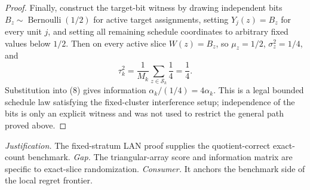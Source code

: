 \documentclass{article}
\begin{document}
\begin{proof}
Finally, construct the target-bit witness by drawing independent bits \(B_z\sim\operatorname{Bernoulli}(1/2)\) for active target assignments, setting \(Y_j(z)=B_z\) for every unit \(j\), and setting all remaining schedule coordinates to arbitrary fixed values below \(1/2\).  Then on every active slice \(W(z)=B_z\), so \(\mu_z=1/2\), \(\sigma_z^2=1/4\), and
\[
 \tau_k^2=\frac1{M_k}\sum_{z\in\mathcal S_k}\frac14=\frac14.
\]
Substitution into (8) gives information \(\alpha_k/(1/4)=4\alpha_k\).  This is a legal bounded schedule law satisfying the fixed-cluster interference setup; independence of the bits is only an explicit witness and was not used to restrict the general path proved above.
\end{proof}
\par\smallskip\noindent \textit{Justification.} The fixed-stratum LAN proof supplies the quotient-correct exact-count benchmark. \textit{Gap.} The triangular-array score and information matrix are specific to exact-slice randomization. \textit{Consumer.} It anchors the benchmark side of the local regret frontier.
\end{document}
